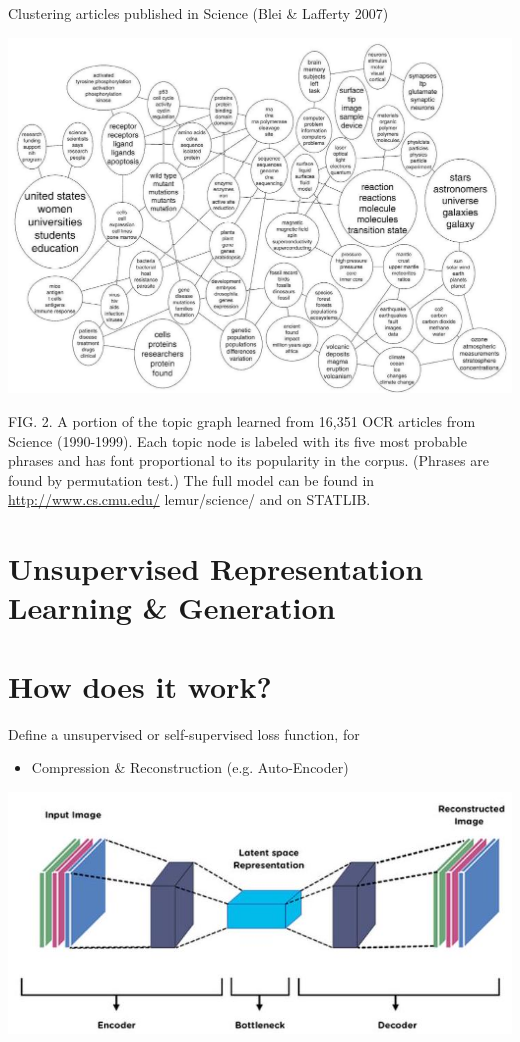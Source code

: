 \documentclass[10pt]{article}
\begin{document}
Clustering articles published in Science (Blei \& Lafferty 2007)

\begin{center}
\includegraphics[max width=\textwidth]{2024_01_08_e090cb7d953bac87fc33g-07}
\end{center}

FIG. 2. A portion of the topic graph learned from 16,351 OCR articles from Science (1990-1999). Each topic node is labeled with its five most probable phrases and has font proportional to its popularity in the corpus. (Phrases are found by permutation test.) The full model can be found in \href{http://www.cs.cmu.edu/}{http://www.cs.cmu.edu/} lemur/science/ and on STATLIB.

\section*{Unsupervised Representation Learning \& Generation}
\section*{How does it work?}
Define a unsupervised or self-supervised loss function, for

\begin{itemize}
  \item Compression \& Reconstruction (e.g. Auto-Encoder)
\end{itemize}

\begin{center}
\includegraphics[max width=\textwidth]{2024_01_08_e090cb7d953bac87fc33g-08}
\end{center}
\end{document}
